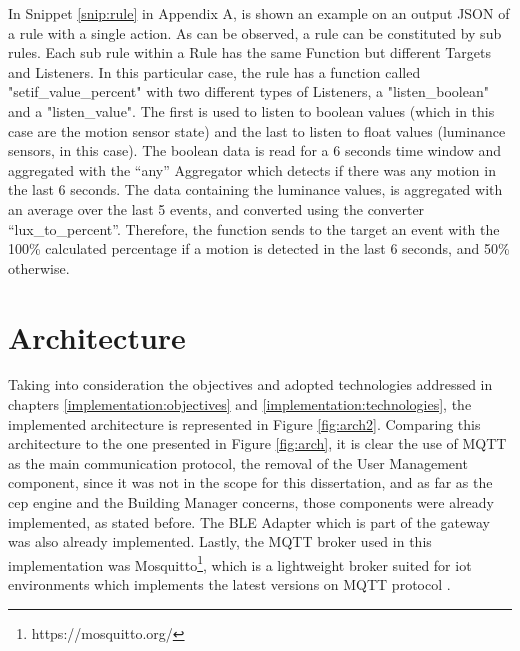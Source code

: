 In Snippet \ref{snip:rule} in Appendix A, is shown an example on an output JSON of a rule with a single action. As can be observed, a rule can be constituted by sub rules. Each sub rule within a Rule has the same Function but different Targets and Listeners. In this particular case, the rule has a function called "setif\_value\_percent" with two different types of Listeners, a "listen\_boolean" and a "listen\_value". The first is used to listen to boolean values (which in this case are the motion sensor state) and the last to listen to float values (luminance sensors, in this case). The boolean data is read for a 6 seconds time window and aggregated with the “any” Aggregator which detects if there was any motion in the last 6 seconds. The data containing the luminance values, is aggregated with an average over the last 5 events, and converted using the converter “lux\_to\_percent”. Therefore, the function sends to the target an event with the 100\% calculated percentage if a motion is detected in the last 6 seconds, and 50\% otherwise. 





	
\section{Architecture}
\label{implementation:architecture}
Taking into consideration the objectives and adopted technologies addressed in chapters \ref{implementation:objectives} and \ref{implementation:technologies}, the implemented architecture is represented in Figure \ref{fig:arch2}. Comparing this architecture to the one presented in Figure \ref{fig:arch}, it is clear the use of MQTT as the main communication protocol, the removal of the User Management component, since it was not in the scope for this dissertation, and as far as the \ac{cep} engine and the Building Manager concerns, those components were already implemented, as stated before. The BLE Adapter which is part of the gateway was also already implemented. Lastly, the MQTT broker used in this implementation was Mosquitto\footnote{https://mosquitto.org/}, which is a lightweight broker suited for \ac{iot} environments which implements the latest versions on MQTT protocol . 




